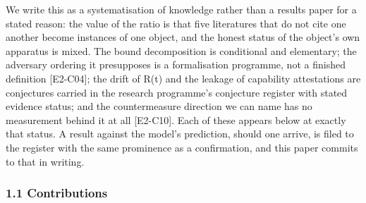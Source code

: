\documentclass[
  11pt,
]{article}
\begin{document}
We write this as a systematisation of knowledge rather than a results
paper for a stated reason: the value of the ratio is that five
literatures that do not cite one another become instances of one object,
and the honest status of the object's own apparatus is mixed. The bound
decomposition is conditional and elementary; the adversary ordering it
presupposes is a formalisation programme, not a finished definition
{[}E2-C04{]}; the drift of R(t) and the leakage of capability
attestations are conjectures carried in the research programme's
conjecture register with stated evidence status; and the countermeasure
direction we can name has no measurement behind it at all {[}E2-C10{]}.
Each of these appears below at exactly that status. A result against the
model's prediction, should one arrive, is filed to the register with the
same prominence as a confirmation, and this paper commits to that in
writing.

\subsubsection{1.1 Contributions}\label{contributions}
\end{document}
